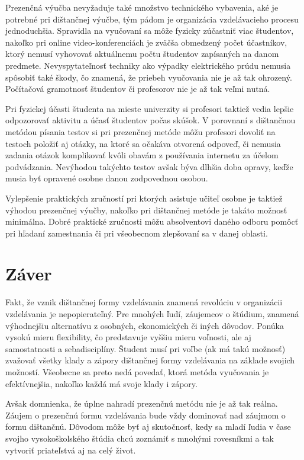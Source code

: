 \documentclass[10pt,slovak,a4paper]{article}
\begin{document}
	Prezenčná výučba nevyžaduje také množstvo technického vybavenia, aké je potrebné pri dištančnej výučbe, tým pádom je organizácia vzdelávacieho procesu jednoduchšia. Spravidla na vyučovaní sa môže fyzicky zúčastniť viac študentov, nakoľko pri online video-konferenciách je zväčša obmedzený počet účastníkov, ktorý nemusí vyhovovať aktuálnemu počtu študentov zapísaných na danom predmete. Nevyspytateľnosť techniky ako výpadky elektrického prúdu nemusia spôsobiť také škody, čo znamená, že priebeh vyučovania nie je až tak ohrozený. Počítačová gramotnosť študentov či profesorov nie je až tak veľmi nutná.

	Pri fyzickej účasti študenta na mieste univerzity si profesori taktiež vedia lepšie odpozorovať aktivitu a účasť študentov počas skúšok. V porovnaní s dištančnou metódou písania testov si pri prezenčnej metóde môžu profesori dovoliť na testoch položiť aj otázky, na ktoré sa očakáva otvorená odpoveď, či nemusia zadania otázok komplikovať kvôli obavám z používania internetu za účelom podvádzania. Nevýhodou takýchto testov avšak býva dlhšia doba opravy, keďže musia byť opravené osobne danou zodpovednou osobou. 

	Vylepšenie praktických zručností pri ktorých asistuje učiteľ osobne je taktiež výhodou prezenčnej výučby, nakoľko pri dištančnej metóde je takáto možnosť minimálna. Dobré praktické zručnosti môžu absolventovi daného odboru pomôcť pri hľadaní zamestnania či pri všeobecnom zlepšovaní sa v danej oblasti. 

\section{Záver}
	Fakt, že vznik dištančnej formy vzdelávania znamená revolúciu v organizácii vzdelávania je nepopierateľný. Pre mnohých ľudí, záujemcov o štúdium, znamená výhodnejšiu alternatívu z osobných, ekonomických či iných dôvodov. Ponúka vysokú mieru flexibility, čo predstavuje vyššiu mieru voľnosti, ale aj samostatnosti a sebadisciplíny. Študent musí pri voľbe (ak má takú možnosť) zvažovať všetky klady a zápory dištančnej formy vzdelávania na základe svojich možností. Všeobecne sa preto nedá povedať, ktorá metóda vyučovania je efektívnejšia, nakoľko každá má svoje klady i zápory. 

	Avšak domnienka, že úplne nahradí prezenčnú metódu nie je až tak reálna. Záujem o prezenčnú formu vzdelávania bude vždy dominovať nad záujmom o formu dištančnú. Dôvodom môže byť aj skutočnosť, kedy sa mladí ľudia v čase svojho vysokoškolského štúdia chcú zoznámiť s mnohými rovesníkmi a tak vytvoriť priateľstvá aj na celý život. 



\end{document}
